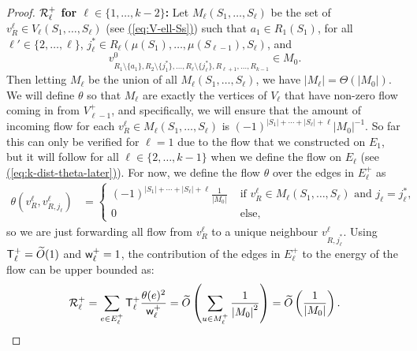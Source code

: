 \documentclass{article}
\newcommand{\eq}[1]{\hyperref[eq:#1]{(\ref*{eq:#1})}}
\renewcommand{\>}{\rangle}
\newcommand{\<}{\langle}
\renewcommand{\(}{\left(}
\renewcommand{\)}{\right)}
\def\abs#1{\left| #1 \right|}
\def\w{{\sf w}}
\begin{document}
\begin{proof}
\vskip7pt
\noindent\textbf{${\cal R}_{\ell}^+$ for $\ell \in \{1,\dots,k-2\}$:} Let $M_{\ell}(S_1,\dots,S_{\ell})$ be the set of $v^{\ell}_{R}\in V_{\ell}(S_1,\dots,S_{\ell})$ (see \eq{V-ell-Ss}) such that $a_1\in R_1(S_1)$, for all $\ell'\in\{2,\dots,\ell\}$, $j_{\ell}^*\in R_{\ell}(\mu(S_1),\dots,\mu(S_{\ell-1}),S_{\ell})$, and 
$$v^0_{R_1\setminus\{a_1\},R_2\setminus\{j_1^*\},\dots,R_{\ell}\setminus\{j_{\ell}^*\},R_{\ell+1},\dots,R_{k-1}}\in M_0.$$
Then letting $M_{\ell}$ be the union of all $M_{\ell}(S_1,\dots,S_{\ell})$, we have $|M_{\ell}|=\Theta(|M_0|)$. 
We will define $\theta$ so that $M_{\ell}$ are exactly the vertices of $V_{\ell}$ that have non-zero flow coming in from $V_{\ell-1}^+$, and specifically, we will ensure that the amount of incoming flow for each $v^{\ell}_R\in M_{\ell}(S_1,\dots,S_{\ell})$ is $(-1)^{\abs{S_1} + \cdots +\abs{S_{\ell}}+\ell}{\abs{M_0}}^{-1}$. So far this can only be verified for $\ell=1$ due to the flow that we constructed on $E_1$, but it will follow for all $\ell \in \{2,\dots,k-1\}$ when we define the flow on $E_{\ell}$ (see \eq{k-dist-theta-later}). For now, we define the flow $\theta$ over the edges in $E_{\ell}^+$ as 
		\begin{align*} 
			\theta(v^{\ell}_{R},v^{\ell}_{R,j_{\ell}})
			&= \begin{cases}
				\left(-1\right)^{\abs{S_1} + \cdots + \abs{S_{\ell}}+\ell}\frac{1}{\abs{M_0}} &\text{ if } v^{\ell}_R \in M_{\ell}(S_1,\dots,S_{\ell})\text{ and } j_{\ell} = j^*_{\ell},\\
				0 &\text{ else},
			\end{cases}
		\end{align*}
so we are just forwarding all flow from $v_R^{\ell}$ to a unique neighbour $v_{R,j_{\ell}^*}^{\ell}$.		
Using ${\sf T}_{\ell}^+=\widetilde{O}(1)$ and $\w_{\ell}^+=1$, the contribution of the edges in $E_{\ell}^+$ to the energy of the flow can be upper bounded as:
		\begin{equation}
			{\cal R}_{\ell}^+ = \sum_{e\in E_{\ell}^{+}}{\sf T}_{\ell}^+\frac{\theta(e)^2}{\w_{\ell}^{+}} = \widetilde{O}\left(\sum_{u\in M_{\ell}^{+}}\frac{1}{\abs{M_0}^2}\right)=\widetilde{O}\left(\frac{1}{\abs{M_0}}\right).\label{eq:k-Rell+}
		\end{equation}


\end{proof}
\end{document}
